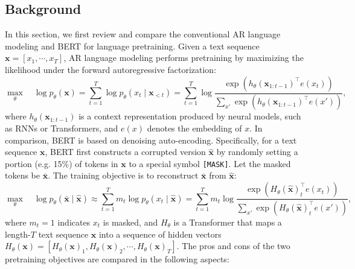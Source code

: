 \documentclass{article}
\newcommand{\seq}[1]{\left[ {#1} \right]}
\newcommand{\expo}[1]{\exp \left( {#1} \right)}
\newcommand{\mask}{\texttt{\small [MASK]}}\newcommand{\cls}{\texttt{\small [CLS]}}\newcommand{\sep}{\texttt{\small [SEP]}}\newcommand{\unk}{\texttt{unk}}
\def\rvx{{\mathbf{x}}}
\begin{document}
\subsection{Background}
\label{sec:background}
In this section, we first review and compare the conventional AR language modeling and BERT for language pretraining.
Given a text sequence $\rvx = \seq{x_1, \cdots, x_T}$, AR language modeling performs pretraining by maximizing the likelihood under the forward autoregressive factorization:
\begin{equation}
\label{eqn:ar}
\max_{\theta}\quad \log p_\theta(\rvx) 
	= \sum_{t=1}^{T} \log p_\theta(x_t \mid \rvx_{<t}) 
	= \sum_{t=1}^{T} \log \frac{ \expo{ h_\theta(\rvx_{1:t-1})^\top e(x_t) } }{\sum_{x'} \expo{ h_\theta(\rvx_{1:t-1})^\top e(x') } },
\end{equation}
where $h_\theta(\rvx_{1:t-1})$ is a context representation produced by neural models, such as RNNs or Transformers, and $e(x)$ denotes the embedding of $x$.
In comparison, BERT is based on denoising auto-encoding.
Specifically, for a text sequence $\rvx$, BERT first constructs a corrupted version $\hat{\rvx}$ by randomly setting a portion (e.g. 15\%) of tokens in $\rvx$ to a special symbol \mask.
Let the masked tokens be $\bar{\rvx}$. The training objective is to reconstruct $\bar{\rvx}$ from $\hat{\rvx}$:
\begin{equation}
\label{eqn:ae}
\max_{\theta}\quad \log p_\theta(\bar{\rvx} \mid \hat{\rvx}) 
\approx \sum_{t=1}^{T} m_t \log p_\theta(x_t \mid \hat{\rvx}) 
= \sum_{t=1}^{T} m_t \log \frac{ \expo{ H_\theta(\hat{\rvx})_t^\top e(x_t) } }{\sum_{x'} \expo{ H_\theta(\hat{\rvx})_t^\top e(x') } },
\end{equation}
where $m_t = 1$ indicates $x_t$ is masked, and $H_\theta$ is a Transformer that maps a length-$T$ text sequence $\rvx$ into a sequence of hidden vectors $H_\theta(\rvx) = \seq{H_\theta(\rvx)_1, H_\theta(\rvx)_2, \cdots, H_\theta(\rvx)_T}$.
The pros and cons of the two pretraining objectives are compared in the following aspects:
\end{document}
